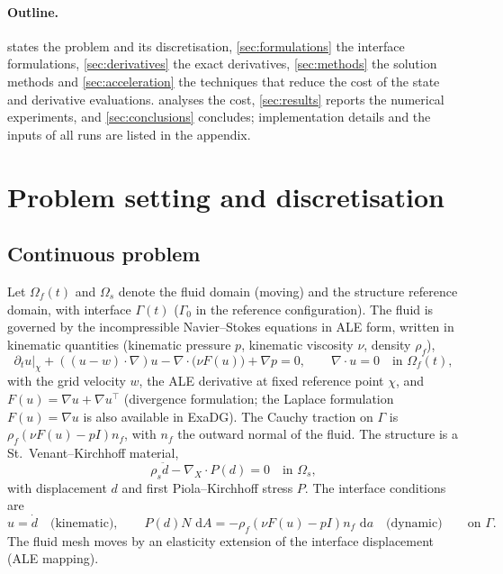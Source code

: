 \documentclass[11pt,a4paper]{article}
\theoremstyle{definition}
\theoremstyle{remark}
\newcommand{\G}{\Gamma}
\newcommand{\dd}{\,\mathrm{d}}
\begin{document}
\paragraph{Outline.}  states the problem and its discretisation,
\cref{sec:formulations} the interface formulations, \cref{sec:derivatives} the exact derivatives,
\cref{sec:methods} the solution methods and \cref{sec:acceleration} the techniques that reduce the
cost of the state and derivative evaluations.  analyses the cost,
\cref{sec:results} reports the numerical experiments, and \cref{sec:conclusions} concludes;
implementation details and the inputs of all runs are listed in the appendix.

\section{Problem setting and discretisation}\label{sec:model}

\subsection{Continuous problem}

Let $\Omega_f(t)$ and $\Omega_s$ denote the fluid domain (moving) and the structure reference
domain, with interface $\G(t)$ ($\G_0$ in the reference configuration). The fluid is governed by the
incompressible Navier--Stokes equations in ALE form, written in kinematic quantities (kinematic
pressure $p$, kinematic viscosity $\nu$, density $\rho_f$),
\begin{equation}\label{eq:ns}
  \partial_t u|_{\chi} + ((u-w)\cdot\nabla)u - \nabla\cdot\big(\nu F(u)\big) + \nabla p = 0,
  \qquad \nabla\cdot u = 0 \quad\text{in } \Omega_f(t),
\end{equation}
with the grid velocity $w$, the ALE derivative at fixed reference point $\chi$, and
$F(u) = \nabla u + \nabla u^{\top}$ (divergence formulation; the Laplace formulation
$F(u)=\nabla u$ is also available in ExaDG). The Cauchy traction on $\G$ is
$\rho_f(\nu F(u) - pI)n_f$, with $n_f$ the outward normal of the fluid. The structure is a
St.~Venant--Kirchhoff material,
\begin{equation}\label{eq:structure}
  \rho_s \ddot d - \nabla_X\cdot P(d) = 0 \quad\text{in }\Omega_s,
\end{equation}
with displacement $d$ and first Piola--Kirchhoff stress $P$. The interface conditions are
\begin{equation}\label{eq:interface}
  u = \dot d \quad\text{(kinematic)},\qquad
  P(d)N\,\dd A = -\rho_f(\nu F(u)-pI)n_f\,\dd a \quad\text{(dynamic)}\qquad\text{on }\G .
\end{equation}
The fluid mesh moves by an elasticity extension of the interface displacement (ALE mapping).
\end{document}
